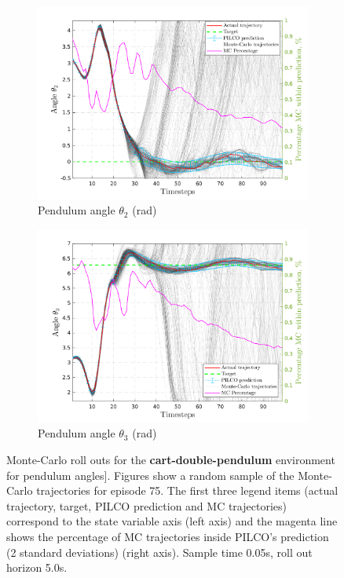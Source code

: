 \begin{figure}[H]    
    \begin{subfigure}[b]{1\linewidth}
    \centering
    \includegraphics[height=0.4\textheight,width=1\textwidth]{Chapter3/Figures/cdp_MC_rollout_Ep_80_Dim_5.png} 
    \caption{Pendulum angle $\theta_2$ (rad)} 
    \label{Fig:Re-cdp-angle2} 
  \end{subfigure}
  \hspace{\fill}
  \begin{subfigure}[b]{1\linewidth}
    \centering
    \includegraphics[height=0.4\textheight,width=1\textwidth]{Chapter3/Figures/cdp_MC_rollout_Ep_80_Dim_6.png} 
    \caption{Pendulum angle $\theta_3$ (rad)} 
    \label{Fig:Re-cdp-angle3} 
  \end{subfigure} 
\caption[Monte-Carlo roll outs for \textbf{cart-double-pendulum} pendulum angles]{Monte-Carlo roll outs for the \textbf{cart-double-pendulum} environment for  pendulum angles]. Figures show a random sample of the Monte-Carlo trajectories for episode 75. The first three legend items (actual trajectory, target, PILCO prediction and MC trajectories) correspond to the state variable axis (left axis) and the magenta line shows the percentage of MC trajectories inside PILCO's prediction (2 standard deviations) (right axis). Sample time 0.05s, roll out horizon 5.0s.}
\label{Fig:Re-cdp-MC-roll-outs-3} 
\end{figure} 
 
